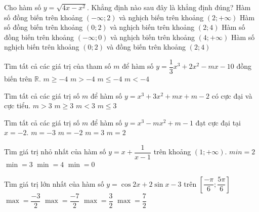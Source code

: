 \begin{ex}%
	Cho hàm số $y=\sqrt{4x-x^2}$. Khẳng định nào sau đây là khẳng định đúng?
	\choice
	{ Hàm số đồng biến trên khoảng $\left( -\infty   ;  2 \right)$ và nghịch biến trên khoảng $\left( 2  ; + \infty  \right)$ }
	{\True Hàm số đồng biến trên khoảng $\left( 0  ;  2 \right)$ và nghịch biến trên khoảng $\left( 2  ; 4 \right)$}
	{ Hàm số đồng biến trên khoảng $\left( -\infty   ;  0 \right)$ và nghịch biến trên khoảng $\left( 4  ; + \infty  \right)$}
	{ Hàm số nghịch biến trên khoảng $\left( 0  ;  2 \right)$ và đồng biến trên khoảng $\left( 2  ; 4 \right)$ }
\end{ex}
\begin{ex}%
	Tìm tất cả các giá trị của tham số $m$ để hàm số $y= \dfrac{1}{3}x^3+2x^2-mx-10$ đồng biến trên $\mathbb{R}$.
	\choice
	{ $m\ge -4$}
	{ $m>-4$}
	{\True $m\le -4$}
	{$m<-4$}
\end{ex}
\begin{ex}%
	Tìm tất cả các giá trị số $m$ để hàm số $y=x^3+3x^2+mx+m-2$ có cực đại và cực tiểu.
	\choice
	{$m>3$}
	{$m\ge 3$}
	{\True $m<3$}	
	{ $m\le 3$}
\end{ex}
\begin{ex}%
	Tìm tất cả các giá trị số $m$ để hàm số $y=x^3-mx^2+m-1$ đạt cực đại tại $x=-2$.
	\choice
	{\True  $m=-3$}
	{ $m=-2$}
	{ $m=3$}
	{ $m=2$}
\end{ex}
\begin{ex}%
	Tìm giá trị nhỏ nhất của hàm số $y=x+\dfrac{1}{x-1}$ trên khoảng $\left( 1 ;+ \infty \right)$.
	\choice
	{ $min=2$}
	{\True $\min=3$}
	{ $\min=4$}
	{ $\min=0$}
\end{ex}
\begin{ex}%
	Tìm giá trị lớn nhất của hàm số $y=\cos 2x+2\sin x-3$ trên $\left[ \dfrac{-\pi }{6}; \dfrac{5\pi }{6} \right]$
	\choice
	{\True $\max= \dfrac{-3}{2}$}
	{ $\max= \dfrac{-7}{2}$}
	{ $\max= \dfrac{3}{2}$}
	{ $\max= \dfrac{7}{2}$}
\end{ex}
